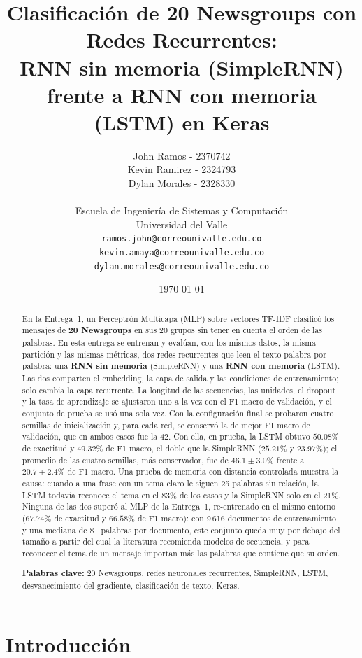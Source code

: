 \documentclass[12pt, a4paper]{article}
\title{
    \textbf{Clasificación de 20 Newsgroups con Redes Recurrentes:} \\
    \large RNN sin memoria (SimpleRNN) frente a RNN con memoria (LSTM) en Keras \\[1em]
}
\author{
    John Ramos - 2370742\\
    Kevin Ramirez - 2324793 \\
    Dylan Morales - 2328330 \\\\
    \small Escuela de Ingeniería de Sistemas y Computación \\ Universidad del Valle\\
    \small \texttt{ramos.john@correounivalle.edu.co} \\
    \small \texttt{kevin.amaya@correounivalle.edu.co} \\
    \small \texttt{dylan.morales@correounivalle.edu.co}
}
\date{\today}
\begin{document}
\maketitle
\thispagestyle{fancy}

\begin{abstract}
En la Entrega~1, un Perceptrón Multicapa (MLP) sobre vectores TF-IDF clasificó los mensajes de \textbf{20 Newsgroups} en sus 20 grupos sin tener en cuenta el orden de las palabras. En esta entrega se entrenan y evalúan, con los mismos datos, la misma partición y las mismas métricas, dos redes recurrentes que leen el texto palabra por palabra: una \textbf{RNN sin memoria} (SimpleRNN) y una \textbf{RNN con memoria} (LSTM). Las dos comparten el embedding, la capa de salida y las condiciones de entrenamiento; solo cambia la capa recurrente. La longitud de las secuencias, las unidades, el dropout y la tasa de aprendizaje se ajustaron uno a la vez con el F1 macro de validación, y el conjunto de prueba se usó una sola vez. Con la configuración final se probaron cuatro semillas de inicialización y, para cada red, se conservó la de mejor F1 macro de validación, que en ambos casos fue la 42. Con ella, en prueba, la LSTM obtuvo $50.08\%$ de exactitud y $49.32\%$ de F1 macro, el doble que la SimpleRNN ($25.21\%$ y $23.97\%$); el promedio de las cuatro semillas, más conservador, fue de $46.1 \pm 3.0\%$ frente a $20.7 \pm 2.4\%$ de F1 macro. Una prueba de memoria con distancia controlada muestra la causa: cuando a una frase con un tema claro le siguen 25 palabras sin relación, la LSTM todavía reconoce el tema en el $83\%$ de los casos y la SimpleRNN solo en el $21\%$. Ninguna de las dos superó al MLP de la Entrega~1, re-entrenado en el mismo entorno ($67.74\%$ de exactitud y $66.58\%$ de F1 macro): con 9\,616 documentos de entrenamiento y una mediana de 81 palabras por documento, este conjunto queda muy por debajo del tamaño a partir del cual la literatura recomienda modelos de secuencia, y para reconocer el tema de un mensaje importan más las palabras que contiene que su orden.

\textbf{Palabras clave:} 20 Newsgroups, redes neuronales recurrentes, SimpleRNN, LSTM, desvanecimiento del gradiente, clasificación de texto, Keras.
\end{abstract}

\tableofcontents
\newpage

\section{Introducción}
\end{document}
